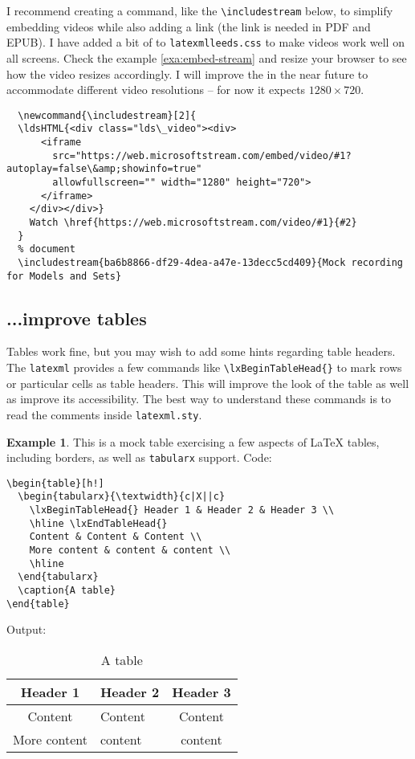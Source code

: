 \documentclass[a4paper]{article}
\def\ltxinline{\lstinline[style=latexml]}
\theoremstyle{definition}
\newtheorem{exa}{Example}[subsection]
\begin{document}
I recommend creating a command, like the \ltxinline|\includestream| below, to simplify embedding videos while also adding a link (the link is needed in PDF and EPUB). I have added a bit of \CSS{} to \verb|latexmlleeds.css| to make videos work well on all screens. Check the example \autoref{exa:embed-stream} and resize your browser to see how the video resizes accordingly. I will improve the \CSS{} in the near future to accommodate different video resolutions -- for now it expects $1280 \times 720$.
\begin{lstlisting}[style=latexml]
  % preamble
  \newcommand{\includestream}[2]{
  \ldsHTML{<div class="lds\_video"><div>
      <iframe
        src="https://web.microsoftstream.com/embed/video/#1?autoplay=false\&amp;showinfo=true"
        allowfullscreen="" width="1280" height="720">
      </iframe>
    </div></div>}
    Watch \href{https://web.microsoftstream.com/video/#1}{#2}
  }
  % document
  \includestream{ba6b8866-df29-4dea-a47e-13decc5cd409}{Mock recording for Models and Sets}
\end{lstlisting}

\subsection{...improve tables}
Tables work fine, but you may wish to add some hints regarding table headers. The \verb|latexml| provides a few commands like \ltxinline|\lxBeginTableHead{}| to mark rows or particular cells as table headers. This will improve the look of the \HTML{} table as well as improve its accessibility. The best way to understand these commands is to read the comments inside \verb|latexml.sty|.

\begin{exa}
  This is a mock table exercising a few aspects of \LaTeX{} tables, including borders, as well as \verb|tabularx| support.
  Code:
  \begin{lstlisting}[style=latexml]
\begin{table}[h!]
  \begin{tabularx}{\textwidth}{c|X||c}
    \lxBeginTableHead{} Header 1 & Header 2 & Header 3 \\
    \hline \lxEndTableHead{}
    Content & Content & Content \\
    More content & content & content \\
    \hline
  \end{tabularx}
  \caption{A table}
\end{table}
  \end{lstlisting}
  Output:
  \begin{table}[h!]
    \begin{tabularx}{\textwidth}{c|X||c}
      \lxBeginTableHead{} Header 1 & Header 2 & Header 3 \\
      \hline \lxEndTableHead{}
      Content & Content & Content \\
      More content & content & content \\
      \hline
    \end{tabularx}
    \caption{A table}
  \end{table}
\end{exa}
\end{document}
